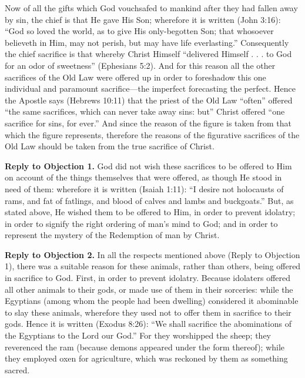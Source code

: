 Now of all the gifts which God vouchsafed to mankind after they had fallen away by sin, the chief is that He gave His Son; wherefore it is written (John 3:16): ``God so loved the world, as to give His only-begotten Son; that whosoever believeth in Him, may not perish, but may have life everlasting.'' Consequently the chief sacrifice is that whereby Christ Himself ``delivered Himself . . . to God for an odor of sweetness'' (Ephesians 5:2). And for this reason all the other sacrifices of the Old Law were offered up in order to foreshadow this one individual and paramount sacrifice—the imperfect forecasting the perfect. Hence the Apostle says (Hebrews 10:11) that the priest of the Old Law ``often'' offered ``the same sacrifices, which can never take away sins: but'' Christ offered ``one sacrifice for sins, for ever.'' And since the reason of the figure is taken from that which the figure represents, therefore the reasons of the figurative sacrifices of the Old Law should be taken from the true sacrifice of Christ.

\textbf{Reply to Objection 1.} God did not wish these sacrifices to be offered to Him on account of the things themselves that were offered, as though He stood in need of them: wherefore it is written (Isaiah 1:11): ``I desire not holocausts of rams, and fat of fatlings, and blood of calves and lambs and buckgoats.'' But, as stated above, He wished them to be offered to Him, in order to prevent idolatry; in order to signify the right ordering of man's mind to God; and in order to represent the mystery of the Redemption of man by Christ.

\textbf{Reply to Objection 2.} In all the respects mentioned above (Reply to Objection 1), there was a suitable reason for these animals, rather than others, being offered in sacrifice to God. First, in order to prevent idolatry. Because idolaters offered all other animals to their gods, or made use of them in their sorceries: while the Egyptians (among whom the people had been dwelling) considered it abominable to slay these animals, wherefore they used not to offer them in sacrifice to their gods. Hence it is written (Exodus 8:26): ``We shall sacrifice the abominations of the Egyptians to the Lord our God.'' For they worshipped the sheep; they reverenced the ram (because demons appeared under the form thereof); while they employed oxen for agriculture, which was reckoned by them as something sacred.

